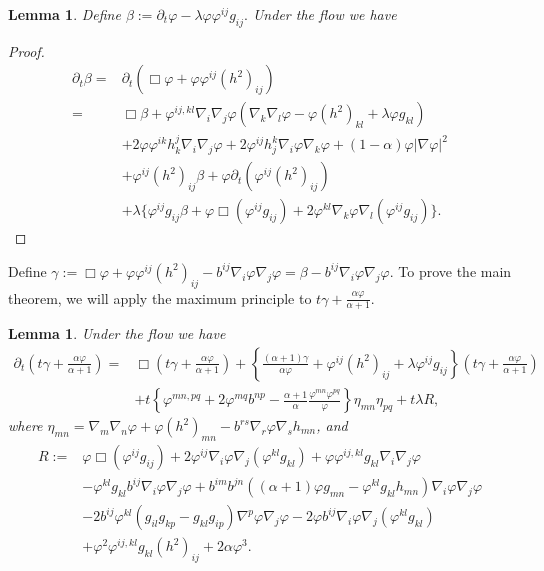 \documentclass{amsart}
\newtheorem{lemma}[theorem]{Lemma}
\theoremstyle{definition}
\theoremstyle{remark}
\numberwithin{equation}{section}
\begin{document}
\begin{lemma}Define $\beta:=\partial_t\varphi-\lambda \varphi\varphi^{ij}g_{ij}.$ Under the flow we have
\end{lemma}
\begin{proof}
\begin{align*}
\partial_t\beta=&\partial_t(\Box \varphi+\varphi\varphi^{ij}(h^2)_{ij})\\
=&\Box\beta+\varphi^{ij,kl}\nabla_i\nabla_j\varphi(\nabla_k\nabla_l\varphi-\varphi(h^2)_{kl}+\lambda \varphi g_{kl})\\
&+2\varphi\varphi^{ik}h_k^j\nabla_i\nabla_j\varphi+2\varphi^{ij}h_j^k\nabla_i\varphi\nabla_k\varphi+(1-\alpha)\varphi|\nabla \varphi|^2\\
&+\varphi^{ij}(h^2)_{ij}\beta+\varphi\partial_t(\varphi^{ij}(h^2)_{ij})\\
&+\lambda\{\varphi^{ij}g_{ij}\beta+\varphi\Box(\varphi^{ij}g_{ij})+2\varphi^{kl}\nabla_k\varphi\nabla_l(\varphi^{ij}g_{ij})\}.
\end{align*}
\end{proof}
 Define $\gamma:=\Box \varphi+\varphi\varphi^{ij}(h^2)_{ij}-b^{ij}\nabla_i\varphi\nabla_j\varphi=\beta-b^{ij}\nabla_i\varphi\nabla_j\varphi.$ To prove the main theorem, we will apply the maximum principle to $t\gamma+\frac{\alpha\varphi}{\alpha+1}.$
\begin{lemma}Under the flow we have
\begin{align*}
\partial_t (t\gamma+\frac{\alpha\varphi}{\alpha+1})=&\Box (t\gamma+\frac{\alpha\varphi}{\alpha+1})+\left\{\frac{(\alpha+1)\gamma}{\alpha\varphi}+\varphi^{ij}(h^2)_{ij}+\lambda\varphi^{ij}g_{ij}\right\}(t\gamma+\frac{\alpha\varphi}{\alpha+1})\\
&+t\left\{\varphi^{mn,pq}+2\varphi^{mq}b^{np}-\frac{\alpha+1}{\alpha}\frac{\varphi^{mn}\varphi^{pq}}{\varphi}\right\}\eta_{mn}\eta_{pq}+t\lambda R,
\end{align*}
where $\eta_{mn}=\nabla_m\nabla_n\varphi+\varphi(h^2)_{mn}-b^{rs}\nabla_r\varphi\nabla_sh_{mn}$, and
\begin{align*}
R:=&\varphi\Box(\varphi^{ij}g_{ij})+2\varphi^{ij}\nabla_i\varphi\nabla_j(\varphi^{kl}g_{kl})+\varphi \varphi^{ij,kl}g_{kl}\nabla_i\nabla_j\varphi\\
&-\varphi^{kl}g_{kl}b^{ij}\nabla_i\varphi\nabla_j\varphi+b^{im}b^{jn}((\alpha+1)\varphi g_{mn}-\varphi^{kl}g_{kl}h_{mn})\nabla_i\varphi\nabla_j\varphi\\
&-2b^{ij}\varphi^{kl}(g_{il}g_{kp}-g_{kl}g_{ip})\nabla^p\varphi\nabla_j\varphi-2\varphi b^{ij}\nabla_i\varphi\nabla_j(\varphi^{kl}g_{kl})\\
&+\varphi^2\varphi^{ij,kl}g_{kl}(h^2)_{ij}+2\alpha\varphi^3.
\end{align*}
\end{lemma}

\begin{thebibliography}{10}
\end{thebibliography}
\end{document}
